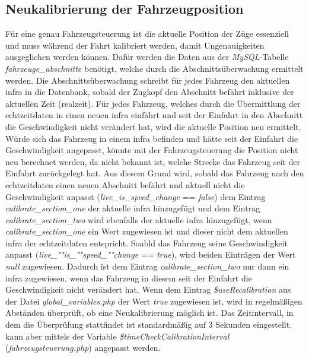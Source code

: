 \subsection{Neukalibrierung der Fahrzeugposition}  \label{main_5}
Für eine genau Fahrzeugsteuerung ist die aktuelle Position der Züge es­sen­zi­ell und muss während der Fahrt kalibriert werden, damit Ungenauigkeiten ausgeglichen werden können. Dafür werden die Daten aus der \textit{MySQL}-Tabelle \textit{fahrzeuge\_abschnitte} benötigt, welche durch die Abschnittsüberwachung ermittelt werden. Die Abschnittsüberwachung schreibt für jedes Fahrzeug den aktuellen \ac{infra} in die Datenbank, sobald der Zugkopf den Abschnitt befährt inklusive der aktuellen Zeit (\Gls{realzeit}). Für jedes Fahrzeug, welches durch die Übermittlung der \Gls{echtzeitdaten} in einen neuen \ac{infra} einfährt und seit der Einfahrt in den Abschnitt die Geschwindigkeit nicht verändert hat, wird die aktuelle Position neu ermittelt. Würde sich das Fahrzeug in einem \ac{infra} befinden und hätte seit der Einfahrt die Geschwindigkeit angepasst, könnte mit der Fahrzeugsteuerung die Position nicht neu berechnet werden, da nicht bekannt ist, welche Strecke das Fahrzeug seit der Einfahrt zurückgelegt hat. Aus diesem Grund wird, sobald das Fahrzeug nach den \Gls{echtzeitdaten} einen neuen Abschnitt befährt und aktuell nicht die Geschwindigkeit anpasst (\textit{live\_is\_speed\_change} == \textit{false}) dem Eintrag \textit{calibrate\_section\_one} der aktuelle \ac{infra} hinzugefügt und dem Eintrag \textit{calibrate\_section\_two} wird ebenfalls der aktuelle \ac{infra} hinzugefügt, wenn \textit{calibrate\_section\_one} ein Wert zugewiesen ist und dieser nicht dem aktuellen \ac{infra} der \Gls{echtzeitdaten} entspricht. Soabld das Fahrzeug seine Geschwindigkeit anpasst (\textit{live\_""is\_""speed\_""change} == \textit{true}), wird beiden Einträgen der Wert \textit{null} zugewiesen. Dadurch ist dem Eintrag \textit{calibrate\_section\_two} nur dann ein \ac{infra} zugewiesen, wenn das Fahrzeug in diesem seit der Einfahrt die Geschwindigkeit nicht verändert hat. Wenn dem Eintrag \textit{\$useRecalibration} aus der Datei \textit{global\_variables.php} der Wert \textit{true} zugewiesen ist, wird in regelmäßigen Abständen überprüft, ob eine Neukalibrierung möglich ist. Das Zeitintervall, in dem die Überprüfung stattfindet ist standardmäßig auf 3 Sekunden eingestellt, kann aber mittels der Variable \textit{\$timeCheckCalibrationInterval} (\textit{fahrzeugsteuerung.php}) angepasst werden.

